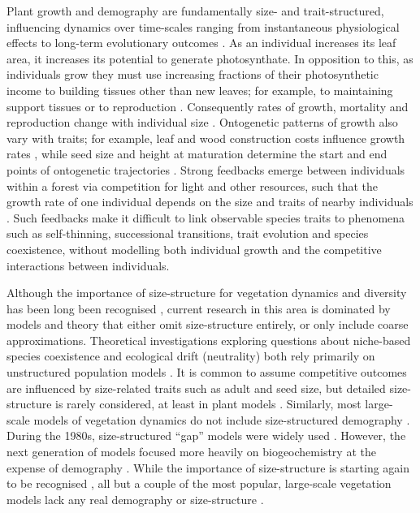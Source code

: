 \documentclass[a4paper,11pt]{article}
\begin{document}
Plant growth and demography are fundamentally size- and 
trait-structured, influencing dynamics over time-scales ranging from
instantaneous physiological effects to long-term evolutionary outcomes
\citep{Harper-1977, Westoby-2002}. 
%
As an individual increases its leaf area, it increases its potential
to generate photosynthate.
%
In opposition to this, as individuals grow they must use increasing
fractions of their photosynthetic income to building tissues other
than new leaves; for example, to maintaining support tissues
\citep{Givnish-1988, Enquist-2007} or to reproduction
\citep{Thomas-2011}.
%
Consequently rates of growth, mortality and reproduction change with
individual size \citep{Muller-2006, Ruger-2011, Thomas-2011}.  
Ontogenetic 
patterns of growth also vary with traits; for example,
leaf and wood construction costs influence growth rates 
\citep{Wright-2010}, while seed size and height
at maturation determine the start and end points of ontogenetic
trajectories \citep{Westoby-2002}.
%
Strong feedbacks emerge between individuals within a forest via
competition for light and other resources, such that the growth rate
of one individual depends on the size and traits of nearby
individuals \citep{Shugart-1980, Pacala-1996}.
%
Such feedbacks make it difficult to link observable species traits to
phenomena such as self-thinning, successional transitions, trait
evolution and species coexistence, without
modelling both individual growth and the competitive interactions between
individuals.

Although the importance of size-structure for vegetation dynamics and
diversity has been long been recognised \citep[e.g.,][]{Harper-1977,
  Shugart-1980, Huston-1987}, current research in this area is
dominated by models and theory that either omit size-structure
entirely, or only include coarse approximations. 
%
Theoretical investigations exploring questions about niche-based
species coexistence and ecological drift (neutrality) both rely
primarily on unstructured population models \citep[e.g.][]{MacArthur-1967,
  Tilman-1985, Geritz-1995, Hubbell-2001, Calcagno-2006}.
%
It is common to assume competitive outcomes are influenced by
size-related traits such as adult and seed size, but detailed
size-structure is rarely considered, at least in plant models
\cite[for animal examples, see][]{Deroos-1988, Deroos-1992}.
Similarly, most large-scale models of vegetation dynamics do not
include size-structured demography \citep{Cramer-2001, Sitch-2003,
  Purves-2008,Dekauwe-2014}.  During the 1980s, size-structured
``gap'' models were widely used
\citep[e.g.][]{Shugart-1980,Huston-1987}. However, the next generation
of models focused more heavily on biogeochemistry at the expense of
demography \citep[e.g.][]{Woodward-1995,Haxeltine-1996,Cramer-2001, 
Sitch-2003}. While the
importance of size-structure is starting again to be recognised
\citep{Moorcroft-2001, Purves-2008, Falster-2011, Dekauwe-2014}, all but a couple
of the most popular,
large-scale vegetation models lack any real demography or
size-structure \citep[see][]{Moorcroft-2001, Smith-2014}.
\end{document}
